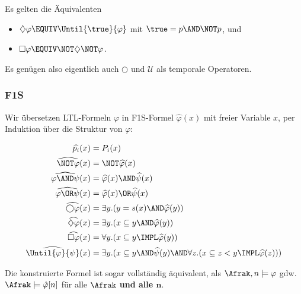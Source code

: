 Es gelten die Äquivalenten
\begin{itemize}
  \item $\diamondsuit \varphi \EQUIV \Until{\true}{\varphi}$ mit $\true = p\AND\NOT p$, und
  \item $\square \varphi \EQUIV \NOT\diamondsuit\NOT \varphi$.
\end{itemize}

Es genügen also eigentlich auch $\bigcirc$ und $\mathcal{U}$ als temporale Operatoren.


\subsubsection{F1S}

Wir übersetzen LTL-Formeln $\varphi$ in F1S-Formel $\widehat{\varphi}(x)$ mit freier
Variable $x$, per Induktion über die Struktur von $\varphi$:

\begin{align*}
  \widehat{p_i}(x)                   &= P_i(x) \\
  \widehat{\NOT\varphi}(x)           &= \NOT\widehat{\varphi}(x) \\
  \widehat{\varphi\AND\psi}(x)       &= \widehat{\varphi}(x)\AND\widehat{\psi}(x) \\
  \widehat{\varphi\OR\psi}(x)        &= \widehat{\varphi}(x)\OR\widehat{\psi}(x) \\
  \widehat{\bigcirc\varphi}(x)       &= \exists y.(y=s(x) \AND \widehat{\varphi}(y)) \\
  \widehat{\diamondsuit\varphi}(x)   &= \exists y.(x\subseteq y \AND \widehat{\varphi}(y)) \\
  \widehat{\square\varphi}(x)        &= \forall y.(x\subseteq y \IMPL \widehat{\varphi}(y)) \\
  \widehat{\Until{\varphi}{\psi}}(x) &= \exists y.(x\subseteq y \AND \widehat{\psi}(y) \AND \forall z.(x\subseteq z < y \IMPL \widehat{\varphi}(z)))
\end{align*}

Die konstruierte Formel ist sogar vollständig äquivalent, als
$\Afrak,n\models\varphi$ gdw. $\Afrak\models\hat{\varphi}[n]$ für alle
$\Afrak$ \textbf{und alle $\mathbf{n}$}.
